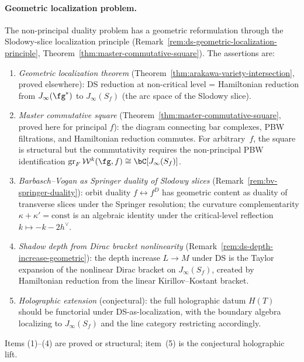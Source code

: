 \paragraph{Geometric localization problem.}
The non-principal duality problem has a geometric reformulation
through the Slodowy-slice localization principle
(Remark~\ref{rem:ds-geometric-localization-principle},
Theorem~\ref{thm:master-commutative-square}). The assertions are:
\begin{enumerate}[label=\textup{(\arabic*)},nosep]
\item \emph{Geometric localization theorem}
 (Theorem~\ref{thm:arakawa-variety-intersection},
 proved elsewhere): DS reduction at non-critical level =
 Hamiltonian reduction from $J_\infty(\fg^*)$ to $J_\infty(S_f)$
 (the arc space of the Slodowy slice).
\item \emph{Master commutative square}
 (Theorem~\ref{thm:master-commutative-square},
 proved here for principal $f$): the diagram connecting
 bar complexes, PBW filtrations, and Hamiltonian reduction
 commutes. For arbitrary~$f$, the square is structural but the
 commutativity requires the non-principal PBW identification
 $\operatorname{gr}_F \mathcal{W}^k(\fg,f) \cong \bC[J_\infty(S_f)]$.
\item \emph{Barbasch--Vogan as Springer duality of Slodowy slices}
 (Remark~\ref{rem:bv-springer-duality}): orbit duality
 $f \leftrightarrow f^D$ has geometric content as duality of
 transverse slices under the Springer resolution; the curvature
 complementarity $\kappa + \kappa' = \mathrm{const}$ is an algebraic
 identity under the critical-level reflection
 \(k \mapsto -k - 2h^\vee\).
\item \emph{Shadow depth from Dirac bracket nonlinearity}
 (Remark~\ref{rem:ds-depth-increase-geometric}): the depth
 increase $L \to M$ under DS is the Taylor expansion of the
 nonlinear Dirac bracket on $J_\infty(S_f)$, created by
 Hamiltonian reduction from the linear Kirillov--Kostant bracket.
\item \emph{Holographic extension} (conjectural): the full
 holographic datum $H(T)$ should be functorial under DS-as-localization,
 with the boundary algebra localizing to $J_\infty(S_f)$ and the
 line category restricting accordingly.
\end{enumerate}
Items (1)--(4) are proved or structural; item~(5) is the conjectural
holographic lift.

